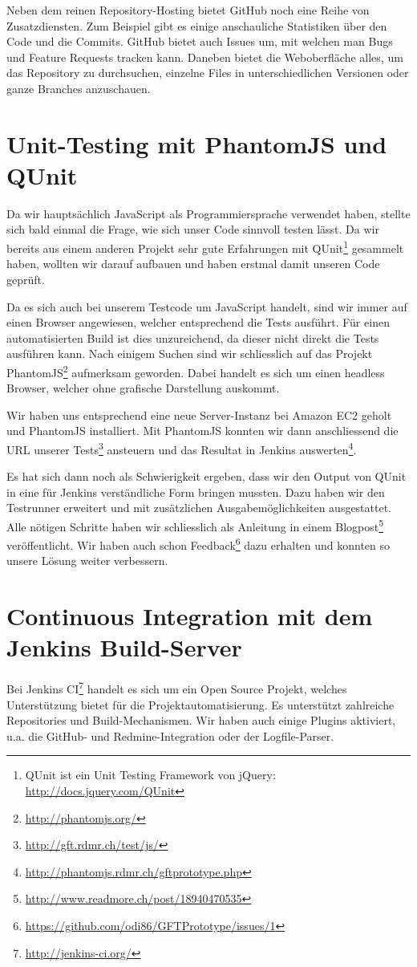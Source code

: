 Neben dem reinen Repository-Hosting bietet GitHub noch eine Reihe von Zusatzdiensten. Zum Beispiel gibt es einige anschauliche Statistiken über den Code und die Commits. GitHub bietet auch Issues um, mit welchen man Bugs und Feature Requests tracken kann. Daneben bietet die Weboberfläche alles, um das Repository zu durchsuchen, einzelne Files in unterschiedlichen Versionen oder ganze Branches anzuschauen. 

\section{Unit-Testing mit PhantomJS und QUnit}
Da wir hauptsächlich JavaScript als Programmiersprache verwendet haben, stellte sich bald einmal die Frage, wie sich unser Code sinnvoll testen lässt. Da wir bereits aus einem anderen Projekt sehr gute Erfahrungen mit QUnit\footnote{QUnit ist ein Unit Testing Framework von jQuery: \url{http://docs.jquery.com/QUnit}} gesammelt haben, wollten wir darauf aufbauen und haben erstmal damit unseren Code geprüft.

Da es sich auch bei unserem Testcode um JavaScript handelt, sind wir immer auf einen Browser angewiesen, welcher entsprechend die Tests ausführt. Für einen automatisierten Build ist dies unzureichend, da dieser nicht direkt die Tests ausführen kann. Nach einigem Suchen sind wir schliesslich auf das Projekt PhantomJS\footnote{\url{http://phantomjs.org/}} aufmerksam geworden. Dabei handelt es sich um einen headless Browser, welcher ohne grafische Darstellung auskommt.

Wir haben uns entsprechend eine neue Server-Instanz bei Amazon EC2 geholt und PhantomJS installiert. Mit PhantomJS konnten wir dann anschliessend die URL unserer Tests\footnote{\url{http://gft.rdmr.ch/test/js/}} ansteuern und das Resultat in Jenkins auswerten\footnote{\url{http://phantomjs.rdmr.ch/gftprototype.php}}.

Es hat sich dann noch als Schwierigkeit ergeben, dass wir den Output von QUnit in eine für Jenkins verständliche Form bringen mussten. Dazu haben wir den Testrunner  erweitert und mit zusätzlichen Ausgabemöglichkeiten ausgestattet. Alle nötigen Schritte haben wir schliesslich als Anleitung in einem Blogpost\footnote{\url{http://www.readmore.ch/post/18940470535}} veröffentlicht. Wir haben auch schon Feedback\footnote{\url{https://github.com/odi86/GFTPrototype/issues/1}} dazu erhalten und konnten so unsere Lösung weiter verbessern.

\section{Continuous Integration mit dem Jenkins Build-Server}
Bei Jenkins CI\footnote{\url{http://jenkins-ci.org/}} handelt es sich um ein Open Source Projekt, welches Unterstützung bietet für die Projektautomatisierung. Es unterstützt zahlreiche Repositories und Build-Mechanismen. Wir haben auch einige Plugins aktiviert, u.a. die GitHub- und Redmine-Integration oder der Logfile-Parser.

